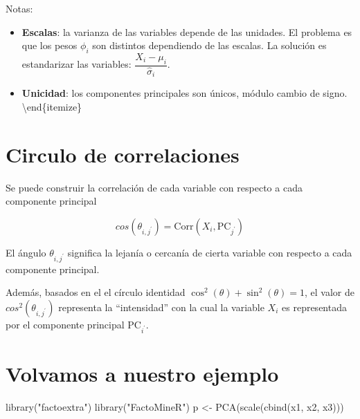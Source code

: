 \documentclass[
  12pt,
]{book}
\newenvironment{Shaded}{\begin{snugshade}}{\end{snugshade}}
\newcommand{\FunctionTok}[1]{\textcolor[rgb]{0.00,0.00,0.00}{#1}}
\newcommand{\NormalTok}[1]{#1}
\newcommand{\OtherTok}[1]{\textcolor[rgb]{0.56,0.35,0.01}{#1}}
\newcommand{\SpecialCharTok}[1]{\textcolor[rgb]{0.00,0.00,0.00}{#1}}
\newcommand{\StringTok}[1]{\textcolor[rgb]{0.31,0.60,0.02}{#1}}
\providecommand{\tightlist}{%
  \setlength{\itemsep}{0pt}\setlength{\parskip}{0pt}}
\begin{document}
Notas:

\begin{itemize}
\tightlist
\item
  \textbf{Escalas}: la varianza de las variables depende de las
  unidades. El problema es que los pesos \(\phi_i\) son distintos
  dependiendo de las escalas. La solución es estandarizar las variables:
  \(\dfrac{X_i-\mu_i}{\hat\sigma_i}\).
\item
  \textbf{Unicidad}: los componentes principales son únicos, módulo
  cambio de signo. \textbackslash end\{itemize\}
\end{itemize}

\hypertarget{circulo-de-correlaciones}{%
\section{Circulo de correlaciones}\label{circulo-de-correlaciones}}

Se puede construir la correlación de cada variable con respecto a cada
componente principal

\[
cos(\theta_{i,j^\prime}) = \mathrm{Corr}(X_i, \mathrm{PC}_{j^\prime})
\]

El ángulo \(\theta_{i,j^\prime}\) significa la lejanía o cercanía de
cierta variable con respecto a cada componente principal.

Además, basados en el el círculo identidad
\(\cos^2(\theta)+\sin^2(\theta)=1\), el valor de
\(cos^2(\theta_{i,j^\prime})\) representa la ``intensidad'' con la cual
la variable \(X_i\) es representada por el componente principal
\(\mathrm{PC}_{i^\prime}\).

\hypertarget{volvamos-a-nuestro-ejemplo}{%
\section{Volvamos a nuestro ejemplo}\label{volvamos-a-nuestro-ejemplo}}

\begin{Shaded}
\begin{Highlighting}[]
\FunctionTok{library}\NormalTok{(}\StringTok{"factoextra"}\NormalTok{)}
\FunctionTok{library}\NormalTok{(}\StringTok{"FactoMineR"}\NormalTok{)}
\NormalTok{p }\OtherTok{\textless{}{-}} \FunctionTok{PCA}\NormalTok{(}\FunctionTok{scale}\NormalTok{(}\FunctionTok{cbind}\NormalTok{(x1, x2, x3)))}
\end{Highlighting}
\end{Shaded}

\begin{Shaded}
\end{Shaded}
\end{document}
